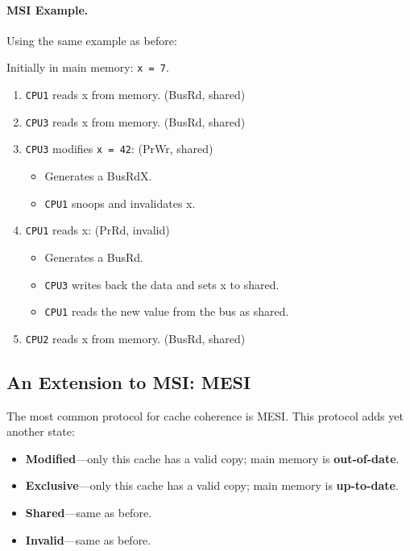 \documentclass[a4paper]{report}
\begin{document}
\paragraph{MSI Example.} Using the same example as before:

Initially in main memory: {\tt x = 7}.

  \begin{enumerate}
    \item {\tt CPU1} reads x from memory. {(BusRd, shared)}
    \item {\tt CPU3} reads x from memory. {(BusRd, shared)}
    \item {\tt CPU3} modifies {\tt x = 42}: {(PrWr, shared)}
      \begin{itemize}
        \item {Generates a BusRdX.}
        \item {{\tt CPU1} snoops and invalidates x.}
      \end{itemize}
    \item {\tt CPU1} reads x: {(PrRd, invalid)}
      \begin{itemize}
        \item {Generates a BusRd.}
        \item {{\tt CPU3} writes back the data and sets x to shared.}
        \item {{\tt CPU1} reads the new value from the bus as shared.}
      \end{itemize}
    \item {\tt CPU2} reads x from memory. {(BusRd, shared)}
  \end{enumerate}

\subsection*{An Extension to MSI: MESI}
    The most common protocol for cache coherence is MESI.
    This protocol adds yet another state:
      \begin{itemize}
        \item {\bf Modified}---only this cache has a valid copy; 
 main memory is {\bf out-of-date}.
        \item {\bf Exclusive}---only this cache has a valid copy; 
 main memory is {\bf up-to-date}.
        \item {\bf Shared}---same as before.
        \item {\bf Invalid}---same as before.
      \end{itemize}
\end{document}
